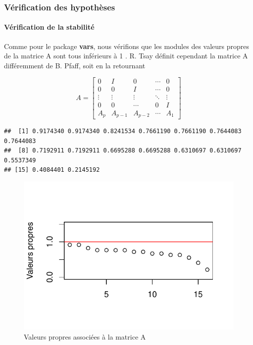\documentclass[11pt,]{article}
\let\oldparagraph\paragraph
\renewcommand{\paragraph}[1]{\oldparagraph{#1}\mbox{}}
\begin{document}
\subsubsection{Vérification des
hypothèses}\label{verification-des-hypotheses}

\paragraph{Vérification de la
stabilité}\label{verification-de-la-stabilite}

Comme pour le package \textbf{vars}, nous vérifions que les modules des
valeurs propres de la matrice A sont tous inférieurs à 1 . R. Tsay
définit cependant la matrice A différemment de B. Pfaff, soit en la
retournant

\[A = \begin{bmatrix}
0 & I & 0 & \cdots & 0 \\
0 & 0 & I & \cdots & 0 \\
\vdots & \vdots & \vdots & \ddots & \vdots \\
0 & 0 & \cdots & 0 & I \\
A_p & A_{p-1} & A_{p-2} & \cdots  & A_1 
\end{bmatrix}\]

\begin{verbatim}
##  [1] 0.9174340 0.9174340 0.8241534 0.7661190 0.7661190 0.7644083 0.7644083
##  [8] 0.7192911 0.7192911 0.6695288 0.6695288 0.6310697 0.6310697 0.5537349
## [15] 0.4084401 0.2145192
\end{verbatim}

\begin{figure}[htbp]
\centering
\includegraphics{Rapport_final_files/figure-latex/unnamed-chunk-46-1.pdf}
\caption{\label{fig27} Valeurs propres associées à la matrice A}
\end{figure}
\end{document}
